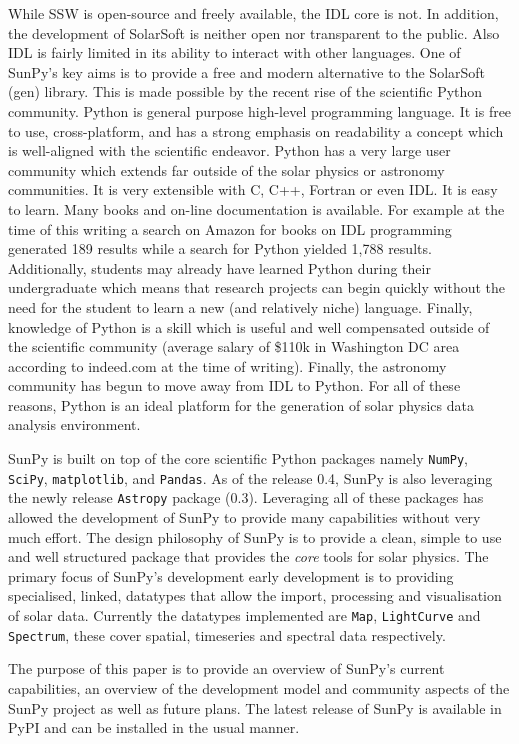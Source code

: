 While SSW is open-source and freely available, the IDL core is not. In addition, the development
of SolarSoft is neither open nor transparent to the public. Also IDL is fairly limited in 
its ability to interact with other languages. One of SunPy's key aims is to 
provide a free and modern alternative to the SolarSoft (gen) library. This is made possible
by the recent rise of the scientific Python community. Python is general purpose 
high-level programming language. It is free to use, cross-platform, and has a strong
emphasis on readability a concept which is well-aligned with the scientific endeavor.
Python has a very large user community which extends far outside of the solar physics
or astronomy communities. It is very extensible with C, C++, Fortran or even IDL. It is 
easy to learn. Many books and on-line documentation is available. For example at the time
of this writing a search on Amazon for books on IDL programming generated 189 results while a search
for Python yielded 1,788 results. Additionally, students may already have learned Python during their 
undergraduate which means that research projects can begin quickly without the need for 
the student to learn a new (and relatively niche) language. Finally, knowledge of Python is a skill which is useful
and well compensated outside of the scientific community (average salary of \$110k in Washington DC area according
to indeed.com at the time of writing). Finally, the astronomy community has begun to
move away from IDL to Python. For all of these reasons, Python is an ideal platform for
the generation of solar physics data analysis environment.

SunPy is built on top of the core scientific Python packages namely \texttt{NumPy}, \texttt{SciPy}, 
\texttt{matplotlib}, and \texttt{Pandas}. As of the release 0.4, SunPy is also leveraging the 
newly release \texttt{Astropy} package (0.3). Leveraging all of these packages has allowed 
the development of SunPy to provide many capabilities without very much effort. The design
philosophy of SunPy is to provide a clean, simple to use and well structured 
package that provides the \textit{core} tools for solar physics.
The primary focus of SunPy's development early development is to providing specialised, 
linked, datatypes that allow the import, processing and visualisation of solar 
data. Currently the datatypes implemented are \texttt{Map}, \texttt{LightCurve} 
and \texttt{Spectrum}, these cover spatial, timeseries and spectral data 
respectively.

The purpose of this paper is to provide an overview of SunPy's current capabilities, an 
overview of the development model and community aspects of the SunPy project
as well as future plans. The latest release of SunPy is available in 
PyPI and can be installed in the usual manner.
